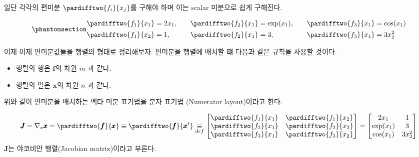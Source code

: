 \documentclass[
  11pt,
  a4paper,
  oneside]{scrbook}
\providecommand{\tightlist}{%
  \setlength{\itemsep}{0pt}\setlength{\parskip}{0pt}}\usepackage{longtable,booktabs,array}
\theoremstyle{definition}
\theoremstyle{definition}
\theoremstyle{plain}
\theoremstyle{remark}
\begin{document}
일단 각각의 편미분 \(\pardifftwo{f_i}{x_j}\)를 구해야 하며 이는 scalar
미분으로 쉽게 구해진다.

\begin{equation}\phantomsection\label{eq-par_deriv}{
\begin{aligned}
\pardifftwo{  f_1}{ x_1} & = 2x_1, & \quad \pardifftwo{  f_2}{ x_1} & = \exp(x_1), & \quad
\pardifftwo{  f_3}{ x_1} & = \cos(x_1) \\
\pardifftwo{  f_1}{ x_2} & = 1,    & \quad \pardifftwo{  f_2}{ x_1} & = 3,         & \quad
\pardifftwo{  f_3}{ x_1} & = 3 x_2^2 \\
\end{aligned}
}\end{equation}

이제 이제 편미분값들을 행렬의 형태로 정리해보자. 편미분을 행렬에 배치할
떄 다음과 같은 규칙을 사용할 것이다.

\begin{itemize}
\tightlist
\item
  행렬의 행은 \(\pmb f\)의 차원 \(m\) 과 같다.
\item
  행렬의 열은 \(\pmb x\)의 차원 \(n\) 과 같다.
\end{itemize}

위와 같이 편미분을 배치하는 벡타 미분 표기법을 분자 표기법 (Numerator
layout)이라고 한다.

\begin{tcolorbox}[enhanced jigsaw, colback=white, colframe=quarto-callout-note-color-frame, opacityback=0, toprule=.15mm, leftrule=.75mm, titlerule=0mm, opacitybacktitle=0.6, title=\textcolor{quarto-callout-note-color}{\faInfo}\hspace{0.5em}{분자 표기법 (Numerator layout)}, colbacktitle=quarto-callout-note-color!10!white, breakable, bottomrule=.15mm, bottomtitle=1mm, toptitle=1mm, arc=.35mm, left=2mm, rightrule=.15mm, coltitle=black]

\[ 
\pmb J = \nabla_x \pmb x =\pardifftwo{ \pmb f}{\pmb x}  \equiv \pardifftwo{ \pmb f}{\pmb x^t}
\underset{def}{\equiv} \begin{bmatrix}
\pardifftwo{  f_1}{ x_1} &  \pardifftwo{  f_1}{ x_2}  \\
\pardifftwo{  f_2}{ x_1} &  \pardifftwo{  f_2}{ x_2}  \\
\pardifftwo{  f_3}{ x_1} &  \pardifftwo{  f_3}{ x_2}
\end{bmatrix}
=  \begin{bmatrix}
2x_1 &  1  \\
\exp(x_1) &  3  \\
\cos(x_1) &  3x_2^2
\end{bmatrix}
\] \(\pmb J\)는 야코비안 행렬(Jacobian matrix)이라고 부른다.

\end{tcolorbox}
\end{document}
